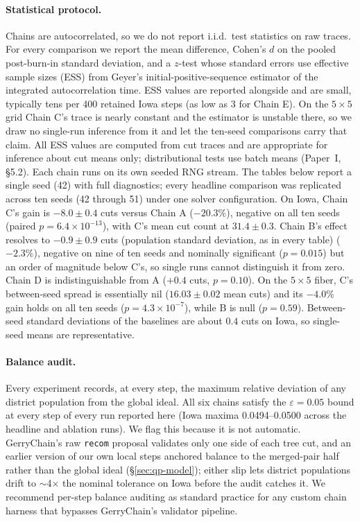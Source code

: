 \documentclass[11pt]{article}
\begin{document}
\paragraph{Statistical protocol.} Chains are autocorrelated, so we do
not report i.i.d.\ test statistics on raw traces. For every
comparison we report the mean difference, Cohen's $d$ on the pooled
post-burn-in standard deviation, and a $z$-test whose standard errors
use effective sample sizes (ESS) from Geyer's initial-positive-sequence
estimator of the integrated autocorrelation time. ESS values are
reported alongside and are small, typically tens per 400 retained
Iowa steps (as low as 3 for Chain E). On the $5 \times 5$ grid Chain
C's trace is nearly constant and the estimator is unstable there, so
we draw no single-run inference from it and let the ten-seed
comparisons carry that claim. All ESS values are computed from cut
traces and are appropriate for inference about cut means only;
distributional tests use batch means (Paper~I, \S5.2).
Each chain runs on its own seeded RNG stream. The tables below report
a single seed (42) with full diagnostics; every headline comparison
was replicated across ten seeds (42 through 51) under one solver
configuration. On Iowa, Chain C's gain is $-8.0 \pm 0.4$ cuts versus
Chain A ($-20.3\%$), negative on all ten seeds (paired
$p = 6.4 \times 10^{-13}$), with C's mean cut count at
$31.4 \pm 0.3$. Chain B's effect resolves to $-0.9 \pm 0.9$ cuts (population
standard deviation, as in every table)
($-2.3\%$), negative on nine of ten seeds and nominally significant
($p = 0.015$) but an order of magnitude below C's, so single runs
cannot distinguish it from zero. Chain D is indistinguishable from A
($+0.4$ cuts, $p = 0.10$). On the $5 \times 5$ fiber, C's between-seed
spread is essentially nil ($16.03 \pm 0.02$ mean cuts) and its
$-4.0\%$ gain holds on all ten seeds ($p = 4.3 \times 10^{-7}$),
while B is null ($p = 0.59$). Between-seed standard deviations of the
baselines are about $0.4$ cuts on Iowa, so single-seed means are
representative.

\paragraph{Balance audit.}\label{sec:exp-balance} Every experiment
records, at every step, the maximum relative deviation of any district
population from the global ideal. All six chains satisfy the
$\varepsilon = 0.05$ bound at every step of every run reported here
(Iowa maxima 0.0494--0.0500 across the headline and ablation runs). We flag this because it is not automatic.
GerryChain's raw \texttt{recom} proposal validates only one side of
each tree cut, and an earlier version of our own local steps anchored
balance to the merged-pair half rather than the global ideal
(\S\ref{sec:qp-model}); either slip lets district populations drift
to $\sim$4$\times$ the nominal tolerance on Iowa before the audit
catches it. We recommend per-step balance auditing as standard
practice for any custom chain harness that bypasses GerryChain's
validator pipeline.
\end{document}
